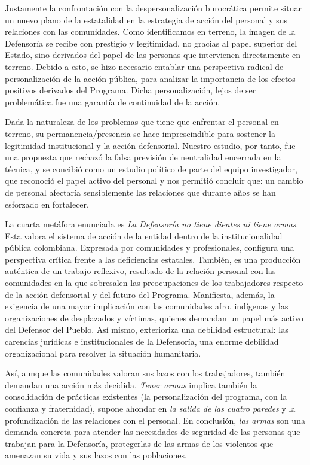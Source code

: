 \documentclass[
  spanish,
  11pt,
  a4paper,
]{scrbook}
\begin{document}
Justamente la confrontación con la despersonalización burocrática
permite situar un nuevo plano de la estatalidad en la estrategia de
acción del personal y sus relaciones con las comunidades. Como
identificamos en terreno, la imagen de la Defensoría se recibe con
prestigio y legitimidad, no gracias al papel superior del Estado, sino
derivados del papel de las personas que intervienen directamente en
terreno. Debido a esto, se hizo necesario entablar una perspectiva
radical de personalización de la acción pública, para analizar la
importancia de los efectos positivos derivados del Programa. Dicha
personalización, lejos de ser problemática fue una garantía de
continuidad de la acción.

Dada la naturaleza de los problemas que tiene que enfrentar el personal
en terreno, su permanencia/presencia se hace imprescindible para
sostener la legitimidad institucional y la acción defensorial. Nuestro
estudio, por tanto, fue una propuesta que rechazó la falsa previsión de
neutralidad encerrada en la técnica, y se concibió como un estudio
político de parte del equipo investigador, que reconoció el papel activo
del personal y nos permitió concluir que: un cambio de personal
afectaría sensiblemente las relaciones que durante años se han esforzado
en fortalecer.

La cuarta metáfora enunciada es \emph{La Defensoría no tiene dientes ni
tiene armas}. Esta valora el sistema de acción de la entidad dentro de
la institucionalidad pública colombiana. Expresada por comunidades y
profesionales, configura una perspectiva crítica frente a las
deficiencias estatales. También, es una producción auténtica de un
trabajo reflexivo, resultado de la relación personal con las comunidades
en la que sobresalen las preocupaciones de los trabajadores respecto de
la acción defensorial y del futuro del Programa. Manifiesta, además, la
exigencia de una mayor implicación con las comunidades afro, indígenas y
las organizaciones de desplazados y víctimas, quienes demandan un papel
más activo del Defensor del Pueblo. Así mismo, exterioriza una debilidad
estructural: las carencias jurídicas e institucionales de la Defensoría,
una enorme debilidad organizacional para resolver la situación
humanitaria.

Así, aunque las comunidades valoran sus lazos con los trabajadores,
también demandan una acción más decidida. \emph{Tener armas} implica
también la consolidación de prácticas existentes (la personalización del
programa, con la confianza y fraternidad), supone ahondar en \emph{la
salida de las cuatro paredes} y la profundización de las relaciones con
el personal. En conclusión, \emph{las armas} son una demanda concreta
para atender las necesidades de seguridad de las personas que trabajan
para la Defensoría, protegerlas de las armas de los violentos que
amenazan su vida y sus lazos con las poblaciones.
\end{document}
